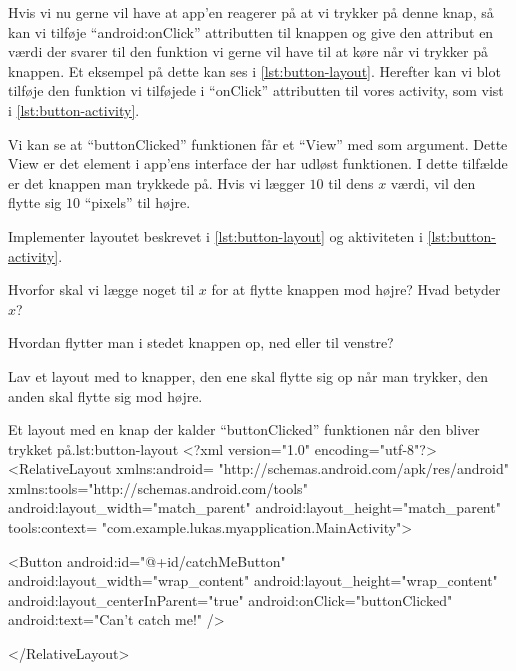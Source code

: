 Hvis vi nu gerne vil have at app'en reagerer på at vi trykker på denne knap, så 
kan vi tilføje ``android:onClick'' attributten til knappen og give den attribut 
en værdi der svarer til den funktion vi gerne vil have til at køre når vi 
trykker på knappen. Et eksempel på dette kan ses i \autoref{lst:button-layout}.
Herefter kan vi blot tilføje den funktion vi tilføjede i ``onClick'' 
attributten til vores activity, som vist i \autoref{lst:button-activity}.

Vi kan se at ``buttonClicked'' funktionen får et ``View'' med som argument. 
Dette View er det element i app'ens \gls{interface} der har udløst funktionen. 
I dette tilfælde er det knappen man trykkede på. Hvis vi lægger $10$ til dens 
$x$ værdi, vil den flytte sig $10$ ``pixels'' til højre.

\begin{exercise}
	Implementer layoutet beskrevet i \autoref{lst:button-layout} og aktiviteten 
	i \autoref{lst:button-activity}.
\end{exercise}

\begin{exercise}
	Hvorfor skal vi lægge noget til $x$ for at flytte knappen mod højre? Hvad 
	betyder $x$?
\end{exercise}

\begin{exercise}
	Hvordan flytter man i stedet knappen op, ned eller til venstre?
\end{exercise}

\begin{exercise}
	Lav et layout med to knapper, den ene skal flytte sig op når man trykker, 
	den anden skal flytte sig mod højre.
\end{exercise}

\clearpage


\begin{XmlCode}{Et layout med en knap der kalder ``buttonClicked'' funktionen%
når den bliver trykket på.}{lst:button-layout}
	<?xml version="1.0" encoding="utf-8"?>
	<RelativeLayout 
		xmlns:android=
			"http://schemas.android.com/apk/res/android"
		xmlns:tools="http://schemas.android.com/tools"
		android:layout_width="match_parent"
		android:layout_height="match_parent"
		tools:context=
			"com.example.lukas.myapplication.MainActivity">
	
	<Button
		android:id="@+id/catchMeButton"
		android:layout_width="wrap_content"
		android:layout_height="wrap_content"
		android:layout_centerInParent="true"
		android:onClick="buttonClicked"
		android:text="Can't catch me!" />
		
	</RelativeLayout>
\end{XmlCode}


